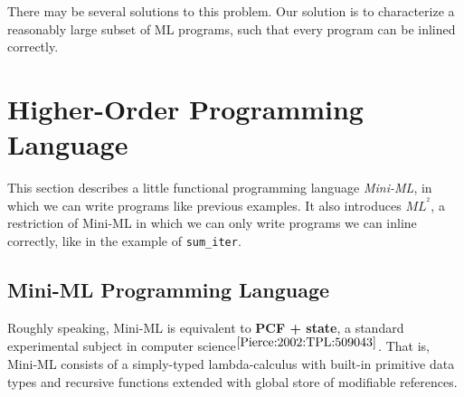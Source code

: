 \documentclass[a4paper,11pt,oneside]{article}
\theoremstyle{plain}
\newcommand{\inlsrc}{\textit{ML}^{^2}}
\begin{document}
There may be several solutions to this problem. 
Our solution is to characterize a reasonably large subset of ML programs, such that every program can be inlined correctly. 

\newpage
\section{Higher-Order Programming Language }
\label{sec:Mini-ML}

	This section describes a little functional programming language \textit{Mini-ML}, in which we can write programs like previous examples. 
	It also introduces ${\inlsrc}$, a restriction of Mini-ML in which we can only write programs we can inline correctly, like in the example of \texttt{sum\_iter}. 
	
\subsection{Mini-ML Programming Language}

	Roughly speaking, Mini-ML is equivalent to \textbf{PCF + state}, a standard experimental subject in computer science{\footnotesize$^{ \cite[p.~143]{Pierce:2002:TPL:509043}}$}. 
	That is, Mini-ML consists of a simply-typed lambda-calculus with built-in primitive data types and recursive functions extended with global store of modifiable references.
	
\end{document}

